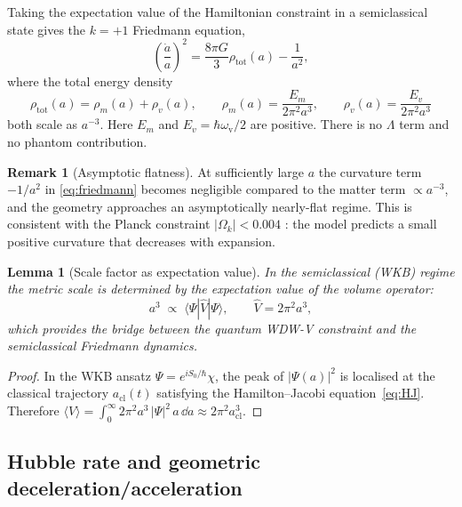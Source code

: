 \documentclass[12pt,a4paper]{article}
\theoremstyle{plain}
\newtheorem{lemma}[theorem]{Lemma}
\theoremstyle{definition}
\newtheorem{remark}[theorem]{Remark}
\newcommand{\omv}{\omega_{\mathrm{v}}}
\begin{document}
Taking the expectation value of the Hamiltonian constraint in a
semiclassical state gives the $k=+1$ Friedmann equation,
\begin{equation}
  \left(\frac{\dot a}{a}\right)^{\!2}
  = \frac{8\pi G}{3}\rho_{\mathrm{tot}}(a) - \frac{1}{a^2},
  \label{eq:friedmann}
\end{equation}
where the total energy density
\begin{equation}
  \rho_{\mathrm{tot}}(a) = \rho_m(a) + \rho_v(a),
  \qquad
  \rho_m(a) = \frac{E_m}{2\pi^2 a^3},
  \qquad
  \rho_v(a) = \frac{E_v}{2\pi^2 a^3}
  \label{eq:rho_tot}
\end{equation}
both scale as $a^{-3}$. Here $E_m$ and $E_v = \hbar\omv/2$ are positive.
There is no $\Lambda$ term and no phantom contribution.

\begin{remark}[Asymptotic flatness]
\label{rem:asymptotic_flat}
At sufficiently large $a$ the curvature term $-1/a^2$ in
\eqref{eq:friedmann} becomes negligible compared to the matter term
$\propto a^{-3}$, and the geometry approaches an asymptotically
nearly-flat regime.
This is consistent with the Planck constraint
$|\Omega_k| < 0.004$ \cite{Planck2020}: the model predicts a small
positive curvature that decreases with expansion.
\end{remark}

\begin{lemma}[Scale factor as expectation value]
\label{lem:scale_factor}
In the semiclassical (WKB) regime the metric scale is determined by the
expectation value of the volume operator:
\begin{equation}
  a^3 \;\propto\; \langle\Psi|\hat V|\Psi\rangle,
  \qquad
  \hat V = 2\pi^2 a^3,
  \label{eq:a_expectation}
\end{equation}
which provides the bridge between the quantum WDW-V constraint and the
semiclassical Friedmann dynamics.
\end{lemma}

\begin{proof}
In the WKB ansatz $\Psi = e^{iS_0/\hbar}\chi$, the peak of
$|\Psi(a)|^2$ is localised at the classical trajectory $a_{\mathrm{cl}}(t)$
satisfying the Hamilton--Jacobi equation~\eqref{eq:HJ}.
Therefore $\langle\hat V\rangle = \int_0^\infty 2\pi^2 a^3\,|\Psi|^2\,
a\,\dd a \approx 2\pi^2 a_{\mathrm{cl}}^3$.
\end{proof}

\subsection{Hubble rate and geometric deceleration/acceleration}
\end{document}
